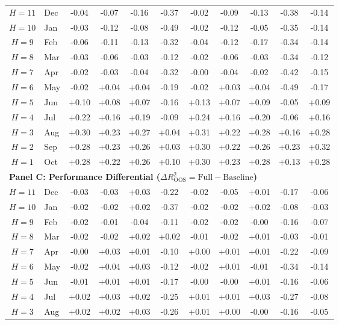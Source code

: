 \begin{table}[htbp]
\begin{tabular*}{\textwidth}{@{\extracolsep{\fill}} c l cccc ccccc @{}}
$H=11$ & Dec & -0.04 & -0.07 & -0.16 & -0.37 & -0.02 & -0.09 & -0.13 & -0.38 & -0.14 \\
$H=10$ & Jan & -0.03 & -0.12 & -0.08 & -0.49 & -0.02 & -0.12 & -0.05 & -0.35 & -0.14 \\
$H=9$ & Feb & -0.06 & -0.11 & -0.13 & -0.32 & -0.04 & -0.12 & -0.17 & -0.34 & -0.14 \\
$H=8$ & Mar & -0.03 & -0.06 & -0.03 & -0.12 & -0.02 & -0.06 & -0.03 & -0.34 & -0.12 \\
$H=7$ & Apr & -0.02 & -0.03 & -0.04 & -0.32 & -0.00 & -0.04 & -0.02 & -0.42 & -0.15 \\
$H=6$ & May & -0.02 & +0.04 & +0.04 & -0.19 & -0.02 & +0.03 & +0.04 & -0.49 & -0.17 \\
$H=5$ & Jun & +0.10 & +0.08 & +0.07 & -0.16 & +0.13 & +0.07 & +0.09 & -0.05 & +0.09 \\
$H=4$ & Jul & +0.22 & +0.16 & +0.19 & -0.09 & +0.24 & +0.16 & +0.20 & -0.06 & +0.16 \\
$H=3$ & Aug & +0.30 & +0.23 & +0.27 & +0.04 & +0.31 & +0.22 & +0.28 & +0.16 & +0.28 \\
$H=2$ & Sep & +0.28 & +0.23 & +0.26 & +0.03 & +0.30 & +0.22 & +0.26 & +0.23 & +0.32 \\
$H=1$ & Oct & +0.28 & +0.22 & +0.26 & +0.10 & +0.30 & +0.23 & +0.28 & +0.13 & +0.28 \\
\midrule
\multicolumn{11}{l}{\textbf{Panel C: Performance Differential ($\Delta R^2_{\text{OOS}} = \text{Full} - \text{Baseline}$)}} \\
$H=11$ & Dec & -0.03 & -0.03 & +0.03 & -0.22 & -0.02 & -0.05 & +0.01 & -0.17 & -0.06 \\
$H=10$ & Jan & -0.02 & -0.02 & +0.02 & -0.37 & -0.02 & -0.02 & +0.02 & -0.08 & -0.03 \\
$H=9$ & Feb & -0.02 & -0.01 & -0.04 & -0.11 & -0.02 & -0.02 & -0.00 & -0.16 & -0.07 \\
$H=8$ & Mar & -0.02 & -0.02 & +0.02 & +0.02 & -0.01 & -0.02 & +0.01 & -0.03 & -0.01 \\
$H=7$ & Apr & -0.00 & +0.03 & +0.01 & -0.10 & +0.00 & +0.01 & +0.01 & -0.22 & -0.09 \\
$H=6$ & May & -0.02 & +0.04 & +0.03 & -0.12 & -0.02 & +0.01 & -0.01 & -0.34 & -0.14 \\
$H=5$ & Jun & -0.01 & +0.01 & +0.01 & -0.17 & -0.00 & -0.00 & +0.01 & -0.16 & -0.06 \\
$H=4$ & Jul & +0.02 & +0.03 & +0.02 & -0.25 & +0.01 & +0.01 & +0.03 & -0.27 & -0.08 \\
$H=3$ & Aug & +0.02 & +0.02 & +0.03 & -0.26 & +0.01 & +0.00 & -0.00 & -0.16 & -0.05 \\

\end{tabular*}
\end{table}
